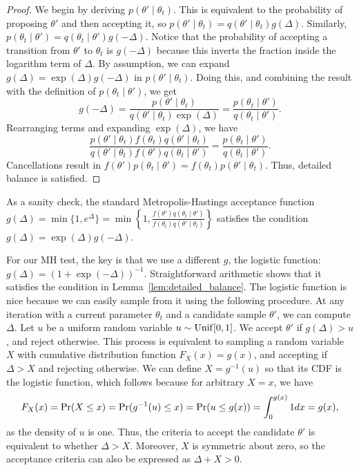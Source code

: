 \documentclass{article}
\begin{document}
\begin{proof}
We begin by deriving $p(\theta' \mid \theta_t)$. This is equivalent to the probability of proposing
$\theta'$ and then accepting it, so $p(\theta' \mid \theta_t) = q(\theta' \mid \theta_t)g(\Delta).$
Similarly, $p(\theta_t \mid \theta') = q(\theta_t \mid \theta')g(-\Delta).$ Notice that the
probability of accepting a transition from $\theta'$ to $\theta_t$ is $g(-\Delta)$ because this
inverts the fraction inside the logarithm term of $\Delta$.  By assumption, we can expand $g(\Delta)
= \exp(\Delta)g(-\Delta)$ in $p(\theta' \mid \theta_t)$. Doing this, and combining the result with
the definition of $p(\theta_t \mid \theta')$, we get
\begin{equation}\label{eq:combined}
g(-\Delta) = \frac{p(\theta' \mid \theta_t)}{q(\theta' \mid \theta_t)\exp(\Delta)} = \frac{p(\theta_t \mid \theta')}{q(\theta_t \mid \theta')}.
\end{equation}
Rearranging terms and expanding $\exp(\Delta)$, we have
\begin{equation}\label{eq:rearrange}
\frac{p(\theta' \mid \theta_t) f(\theta_t) q(\theta' \mid \theta_t)}{q(\theta' \mid \theta_t) f(\theta') q(\theta_t \mid \theta')} = \frac{p(\theta_t \mid \theta')}{ q(\theta_t \mid \theta')}.
\end{equation}
Cancellations result in $f(\theta') p(\theta_t \mid \theta') = f(\theta_t) p(\theta' \mid
\theta_t)$. Thus, detailed balance is satisfied.
\end{proof}

As a sanity check, the standard Metropolis-Hastings acceptance function $g(\Delta) = \min\{1,
e^\Delta \} = \min\left\{1, \frac{f(\theta')q(\theta_t \mid \theta')}{f(\theta_t)q(\theta' \mid
\theta_t)}\right\}$ satisfies the condition $g(\Delta) = \exp(\Delta)g(-\Delta)$.

For our MH test, the key is that we use a different $g$, the logistic function: $g(\Delta) =
(1+\exp(-\Delta))^{-1}$. Straightforward arithmetic shows that it satisfies the condition in
Lemma~\ref{lem:detailed_balance}.  The logistic function is nice because we can easily sample from
it using the following procedure. At any iteration with a current parameter $\theta_t$ and a
candidate sample $\theta'$, we can compute $\Delta$. Let $u$ be a uniform random variable $u \sim
{\rm Unif}[0,1]$. We accept $\theta'$ if $g(\Delta) > u$, and reject otherwise. This process is
equivalent to sampling a random variable $X$ with cumulative distribution function $F_X(x) = g(x)$,
and accepting if $\Delta > X$ and rejecting otherwise. We can define $X = g^{-1}(u)$ so that its CDF
is the logistic function, which follows because for arbitrary $X = x$, we have
\[
F_X(x) = {\rm Pr}(X \le x) = {\rm Pr}(g^{-1}(u) \le x) = {\rm Pr}(u \le g(x)) = \int_{0}^{g(x)} 1 dx = g(x),
\]
as the density of $u$ is one. Thus, the criteria to accept the candidate $\theta'$ is equivalent to
whether $\Delta > X$. Moreover, $X$ is symmetric about zero, so the acceptance criteria can also be
expressed as $\Delta + X>0$.
\end{document}
